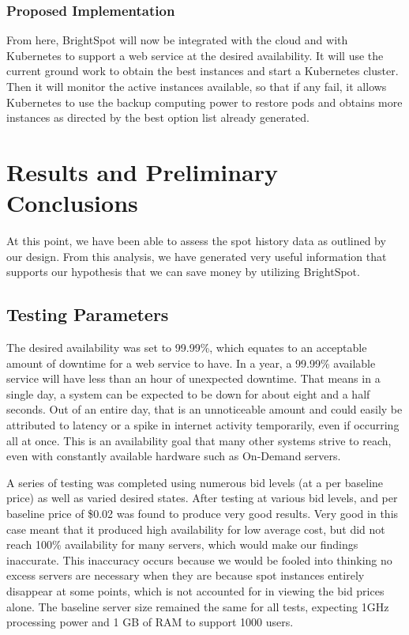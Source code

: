 \documentclass[thesis,proposal]{umassthesis}  %
\begin{document}
\subsection{Proposed Implementation}

From here, BrightSpot will now be integrated with the cloud and with Kubernetes to support a web service at the desired availability. It will use the current ground work to obtain the best instances and start a Kubernetes cluster. Then it will monitor the active instances available, so that if any fail, it allows Kubernetes to use the backup computing power to restore pods and obtains more instances as directed by the best option list already generated.






\chapter{Results and Preliminary Conclusions}

At this point, we have been able to assess the spot history data as outlined by our design. From this analysis, we have generated very useful information that supports our hypothesis that we can save money by utilizing BrightSpot.

\section{Testing Parameters}

The desired availability was set to 99.99\%, which equates to an acceptable amount of downtime for a web service to have. In a year, a 99.99\% available service will have less than an hour of unexpected downtime. That means in a single day, a system can be expected to be down for about eight and a half seconds. Out of an entire day, that is an unnoticeable amount and could easily be attributed to latency or a spike in internet activity temporarily, even if occurring all at once. This is an availability goal that many other systems strive to reach, even with constantly available hardware such as On-Demand servers.\par

A series of testing was completed using numerous bid levels (at a per baseline price) as well as varied desired states. After testing at various bid levels, and per baseline price of \$0.02 was found to produce very good results. Very good in this case meant that it produced high availability for low average cost, but did not reach 100\% availability for many servers, which would make our findings inaccurate. This inaccuracy occurs because we would be fooled into thinking no excess servers are necessary when they are because spot instances entirely disappear at some points, which is not accounted for in viewing the bid prices alone. The baseline server size remained the same for all tests, expecting 1GHz processing power and 1 GB of RAM to support 1000 users.
\end{document}
